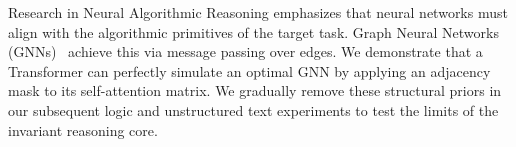 Research in Neural Algorithmic Reasoning emphasizes that neural networks must align with the algorithmic primitives of the target task. Graph Neural Networks (GNNs)~\citep{gilmer2017neural, xu2018how} achieve this via message passing over edges. We demonstrate that a Transformer can perfectly simulate an optimal GNN by applying an adjacency mask to its self-attention matrix. We gradually remove these structural priors in our subsequent logic and unstructured text experiments to test the limits of the invariant reasoning core.


